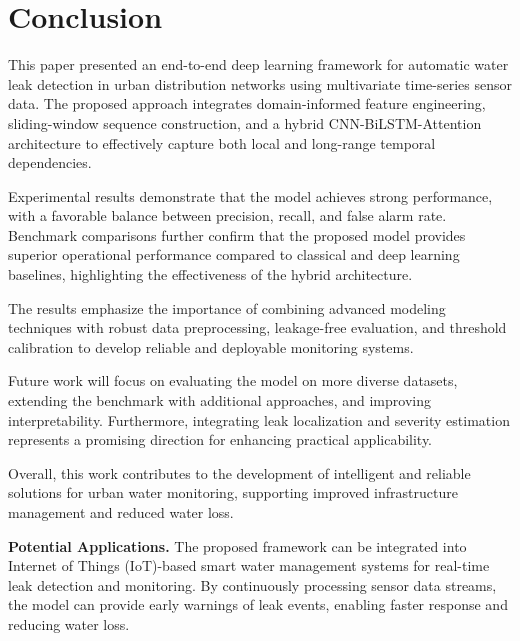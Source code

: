 \section{Conclusion}

\noindent This paper presented an end-to-end deep learning framework for automatic
water leak detection in urban distribution networks using multivariate
time-series sensor data. The proposed approach integrates domain-informed
feature engineering, sliding-window sequence construction, and a hybrid
CNN-BiLSTM-Attention architecture to effectively capture both local and
long-range temporal dependencies.

\vspace{0.2cm}

\noindent Experimental results demonstrate that the model achieves strong performance,
with a favorable balance between precision, recall, and false alarm rate.
Benchmark comparisons further confirm that the proposed model provides superior
operational performance compared to classical and deep learning baselines,
highlighting the effectiveness of the hybrid architecture.

\vspace{0.2cm}

\noindent The results emphasize the importance of combining advanced modeling
techniques with robust data preprocessing, leakage-free evaluation, and
threshold calibration to develop reliable and deployable monitoring systems.

\vspace{0.2cm}

\noindent Future work will focus on evaluating the model on more diverse datasets,
extending the benchmark with additional approaches, and improving
interpretability. Furthermore, integrating leak localization and severity
estimation represents a promising direction for enhancing practical applicability.

\vspace{0.2cm}

\noindent Overall, this work contributes to the development of intelligent and
reliable solutions for urban water monitoring, supporting improved infrastructure
management and reduced water loss.

\vspace{0.2cm}

\noindent \textbf{Potential Applications.}
The proposed framework can be integrated into Internet of Things (IoT)-based
smart water management systems for real-time leak detection and monitoring.
By continuously processing sensor data streams, the model can provide early
warnings of leak events, enabling faster response and reducing water loss.

